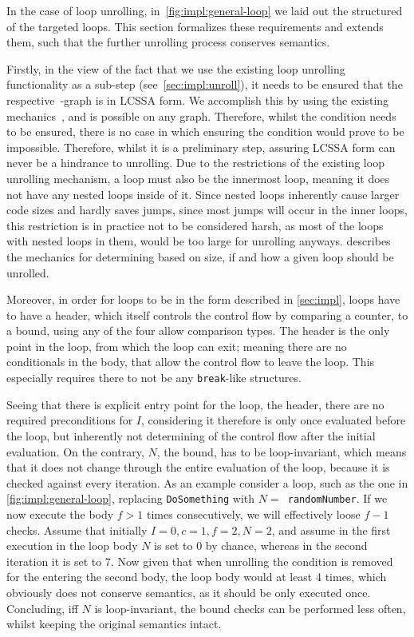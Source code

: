 In the case of loop unrolling, in~\cref{fig:impl:general-loop} we laid out the structured of the targeted loops.
This section formalizes these requirements and extends them, such that the further unrolling process conserves semantics.

Firstly, in the view of the fact that we use the existing loop unrolling functionality as a sub-step (see~\cref{sec:impl:unroll}), it needs to be ensured that the respective~\libFIRM-graph is in LCSSA form.
We accomplish this by using the existing mechanics~\cite{aebi18bachelorarbeit}, and is possible on any graph.
Therefore, whilst the condition needs to be ensured, there is no case in which ensuring the condition would prove to be impossible.
Therefore, whilst it is a preliminary step, assuring LCSSA form can never be a hindrance to unrolling.
Due to the restrictions of the existing loop unrolling mechanism, a loop must also be the innermost loop, meaning it does not have any nested loops inside of it.
Since nested loops inherently cause larger code sizes and hardly saves jumps, since most jumps will occur in the inner loops, this restriction is in practice not to be considered harsh, as most of the loops with nested loops in them, would be too large for unrolling anyways.
 describes the mechanics for determining based on size, if and how a given loop should be unrolled.

Moreover, in order for loops to be in the form described in \cref{sec:impl}, loops have to have a header, which itself controls the control flow by comparing a counter, to a bound, using any of the four allow comparison types.
The header is the only point in the loop, from which the loop can exit; meaning there are no conditionals in the body, that allow the control flow to leave the loop.
This especially requires there to not be any \texttt{break}-like structures.

Seeing that there is explicit entry point for the loop, the header, there are no required preconditions for $I$, considering it therefore is only once evaluated before the loop, but inherently not determining of the control flow after the initial evaluation.
On the contrary, $N$, the bound, has to be loop-invariant, which means that it does not change through the entire evaluation of the loop, because it is checked against every iteration.
As an example consider a loop, such as the one in \cref{fig:impl:general-loop}, replacing \texttt{DoSomething} with \texttt{$N =$ randomNumber}.
If we now execute the body $f > 1$ times consecutively, we will effectively loose $f - 1$ checks.
Assume that initially $I = 0, c = 1, f = 2, N = 2$, and assume in the first execution in the loop body $N$ is set to $0$ by chance, whereas in the second iteration it is set to $7$.
Now given that when unrolling the condition is removed for the entering the second body, the loop body would at least 4 times, which obviously does not conserve semantics, as it should be only executed once.
Concluding, iff $N$ is loop-invariant, the bound checks can be performed less often, whilst keeping the original semantics intact.

